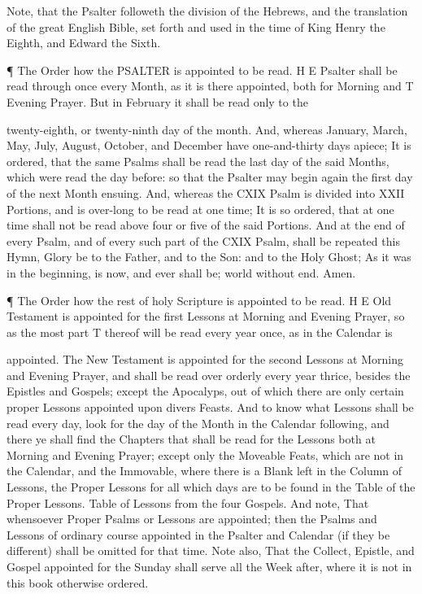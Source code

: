 Note, that the Psalter followeth the division of the Hebrews, and the translation of the great English Bible, set forth and used in the time of King Henry the Eighth, and Edward the Sixth.

¶ The Order how the PSALTER is appointed to be read. H E Psalter shall be read through once every Month, as it is there appointed, both for Morning and T Evening Prayer. But in February it shall be read only to the

twenty-eighth, or twenty-ninth day of the month. And, whereas January, March, May, July, August, October, and December have one-and-thirty days apiece; It is ordered, that the same Psalms shall be read the last day of the said Months, which were read the day before: so that the Psalter may begin again the first day of the next Month ensuing. And, whereas the CXIX Psalm is divided into XXII Portions, and is over-long to be read at one time; It is so ordered, that at one time shall not be read above four or five of the said Portions. And at the end of every Psalm, and of every such part of the CXIX Psalm, shall be repeated this Hymn, Glory be to the Father, and to the Son: and to the Holy Ghost; As it was in the beginning, is now, and ever shall be; world without end. Amen.

¶ The Order how the rest of holy Scripture is appointed to be read. H E Old Testament is appointed for the first Lessons at Morning and Evening Prayer, so as the most part T thereof will be read every year once, as in the Calendar is

appointed. The New Testament is appointed for the second Lessons at Morning and Evening Prayer, and shall be read over orderly every year thrice, besides the Epistles and Gospels; except the Apocalyps, out of which there are only certain proper Lessons appointed upon divers Feasts. And to know what Lessons shall be read every day, look for the day of the Month in the Calendar following, and there ye shall find the Chapters that shall be read for the Lessons both at Morning and Evening Prayer; except only the Moveable Feats, which are not in the Calendar, and the Immovable, where there is a Blank left in the Column of Lessons, the Proper Lessons for all which days are to be found in the Table of the Proper Lessons. Table of Lessons from the four Gospels. And note, That whensoever Proper Psalms or Lessons are appointed; then the Psalms and Lessons of ordinary course appointed in the Psalter and Calendar (if they be different) shall be omitted for that time. Note also, That the Collect, Epistle, and Gospel appointed for the Sunday shall serve all the Week after, where it is not in this book otherwise ordered.

